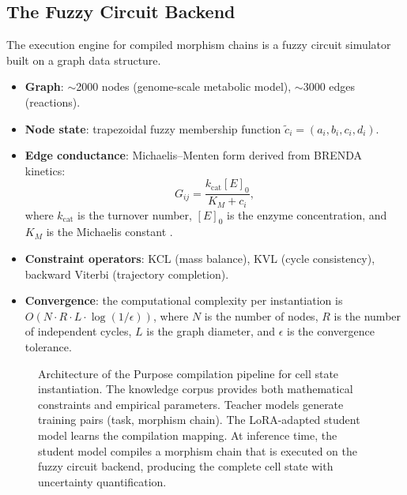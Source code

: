 \documentclass[twocolumn,10pt,a4paper]{article}
\theoremstyle{definition}
\theoremstyle{remark}
\begin{document}
\subsection{The Fuzzy Circuit Backend}

The execution engine for compiled morphism chains is a fuzzy circuit simulator built on a graph data structure.

\begin{itemize}[nosep]
    \item \textbf{Graph}: $\sim$2000 nodes (genome-scale metabolic model), $\sim$3000 edges (reactions).
    \item \textbf{Node state}: trapezoidal fuzzy membership function $\tilde{c}_i = (a_i, b_i, c_i, d_i)$.
    \item \textbf{Edge conductance}: Michaelis--Menten form derived from BRENDA kinetics:
    \begin{equation}
        G_{ij} = \frac{k_{\mathrm{cat}} [E]_0}{K_M + c_i},
        \label{eq:mm_conductance}
    \end{equation}
    where $k_{\mathrm{cat}}$ is the turnover number, $[E]_0$ is the enzyme concentration, and $K_M$ is the Michaelis constant \citep{MichaelisMenten1913}.
    \item \textbf{Constraint operators}: KCL (mass balance), KVL (cycle consistency), backward Viterbi (trajectory completion).
    \item \textbf{Convergence}: the computational complexity per instantiation is $O(N \cdot R \cdot L \cdot \log(1/\epsilon))$, where $N$ is the number of nodes, $R$ is the number of independent cycles, $L$ is the graph diameter, and $\epsilon$ is the convergence tolerance.
\end{itemize}

\begin{figure}[t]
    \centering
    \caption{Architecture of the Purpose compilation pipeline for cell state instantiation. The knowledge corpus provides both mathematical constraints and empirical parameters. Teacher models generate training pairs (task, morphism chain). The LoRA-adapted student model learns the compilation mapping. At inference time, the student model compiles a morphism chain that is executed on the fuzzy circuit backend, producing the complete cell state with uncertainty quantification.}
    \label{fig:pipeline}
\end{figure}
\end{document}
